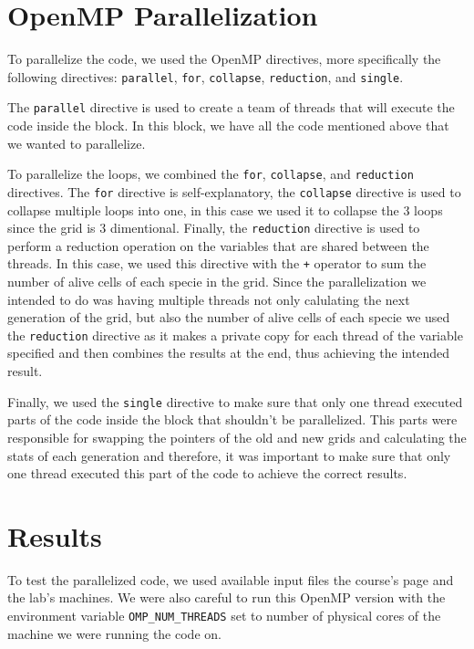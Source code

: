 \documentclass{article}
\begin{document}
\section{OpenMP Parallelization}
To parallelize the code, we used the OpenMP directives, more specifically  
the following directives: \texttt{parallel}, \texttt{for}, \texttt{collapse}, 
\texttt{reduction}, and \texttt{single}.

The \texttt{parallel} directive is used to create a team of threads 
that will execute the code inside the block. In this block, we have 
all the code mentioned above that we wanted to parallelize. 

To parallelize the loops, we combined the \texttt{for}, \texttt{collapse}, 
and \texttt{reduction} directives. The \texttt{for} directive is self-explanatory, 
the \texttt{collapse} directive is used to collapse multiple loops into one, in 
this case we used it to collapse the 3 loops since the grid is 3 dimentional.
Finally, the \texttt{reduction} directive is used to perform a reduction 
operation on the variables that are shared between the threads. In this case, we 
used this directive with the \texttt{+} operator to sum the number of alive cells 
of each specie in the grid. Since the parallelization we intended to do was having 
multiple threads not only calulating the next generation of the grid, but also the 
number of alive cells of each specie we used the \texttt{reduction} directive as it 
makes a private copy for each thread of the variable specified and then combines 
the results at the end, thus achieving the intended result. 

Finally, we used the \texttt{single} directive to make sure that only one thread 
executed parts of the code inside the block that shouldn't be parallelized. This 
parts were responsible for swapping the pointers of the old and new grids and calculating the 
stats of each generation and therefore, it was important to make sure that only 
one thread executed this part of the code to achieve the correct results.

\section{Results}

To test the parallelized code, we used available input files the course's page 
and the lab's machines. We were also careful to run this OpenMP version with the 
environment variable \texttt{OMP\_NUM\_THREADS} set to number of physical cores 
of the machine we were running the code on. 
\end{document}
